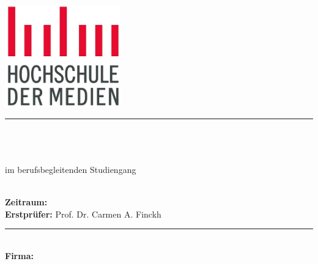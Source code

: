 \newcommand{\HRule}[2]{\noindent\rule[#1]{\linewidth}{#2}} %
\newcommand{\vlinespace}[1]{\vspace*{#1\baselineskip}} %
\newcommand{\titleemph}[1]{\textbf{#1}} %

\begin{titlepage}
 \sffamily %
      \hfill \includegraphics[width=5cm]{fig/aa-titel/HDM_Logo}
      \HRule{13pt}{1pt} 
   \centering
      \Large
      \vlinespace{3}\\
      \workTyp\\
      \huge
      \workTitel\\
%
      \Large
      \vlinespace{2}
          im berufsbegleitenden Studiengang \workStudiengang \\
%      
      \workSemester\\
%     
      \vlinespace{2}
      \workNameStudent
%
   \vfill
   \raggedright
%   
   \large
   \titleemph{Zeitraum:} \workZeitraum \\ %
   \titleemph{Erstprüfer:} Prof. Dr. Carmen A. Finckh \\%

   \vlinespace{1}
   \HRule{13pt}{1pt} \\
   \titleemph{Firma:} \workFirma \\
%
\end{titlepage}
